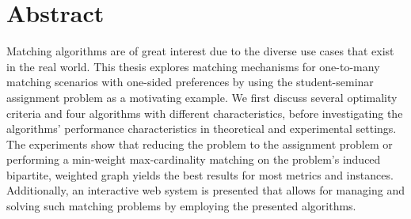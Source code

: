 \section*{Abstract}\label{sec:abstract}

Matching algorithms are of great interest due to the diverse use cases that exist in the real world. This thesis explores matching mechanisms for one-to-many matching scenarios with one-sided preferences by using the student-seminar assignment problem as a motivating example. We first discuss several optimality criteria and four algorithms with different characteristics, before investigating the algorithms' performance characteristics in theoretical and experimental settings. The experiments show that reducing the problem to the assignment problem or performing a min-weight max-cardinality matching on the problem's induced bipartite, weighted graph yields the best results for most metrics and instances. Additionally, an interactive web system is presented that allows for managing and solving such matching problems by employing the presented algorithms. 